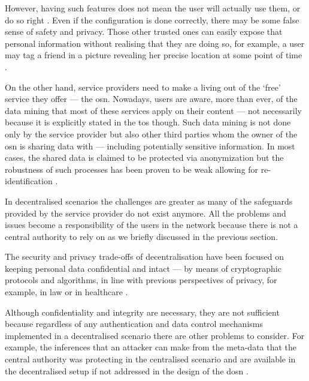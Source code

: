 \documentclass[showtrims, oldfontcommands]{kthesis}
\begin{document}
However, having such features does not mean the user will actually use them, or   
do so right \cite{KrishnamurthyW08, BrandtzaegLS10}. Even if the configuration is 
done correctly, there may be some false sense of safety and privacy. Those other 
trusted ones can easily expose that personal information without realising that 
they are doing so, for example, a user may tag a friend in a picture revealing her 
precise location at some point of time \cite{ZhelevaG09, SmithSHV12}. 

On the other hand, service providers need to make a living out of the `free' service
they offer --- the \ac{osn}. Nowadays, users are aware, more than ever, of the data 
mining that most of these services apply on their content --- not necessarily because 
it is explicitly stated in the \ac{tos} though. Such data mining is not done only 
by the service provider but also other third parties whom the owner of the \ac{osn} 
is sharing data with --- including potentially sensitive information. In most cases, 
the shared data is claimed to be protected via anonymization but the robustness 
of such processes has been proven to be weak allowing for re-identification \cite{NarayananS09}.

In decentralised scenarios the challenges are greater as many of the safeguards 
provided by the service provider do not exist anymore. All the problems and issues 
become a responsibility of the users in the network because there is not a central 
authority to rely on as we briefly discussed in the previous section.

The security and privacy trade-offs of decentralisation have been focused on keeping 
personal data confidential and intact --- by means of cryptographic protocols and 
algorithms, in line with previous perspectives of privacy, for example, in law \cite{Harvey92} 
or in healthcare \cite{BarrowsC96}. 

Although confidentiality and integrity are necessary, they are not sufficient because 
regardless of any authentication and data control mechanisms implemented in a decentralised 
scenario there are other problems to consider. For example, the inferences that 
an attacker can make from the meta-data that the central authority was protecting 
in the centralised scenario and are available in the decentralised setup if not addressed 
in the design of the \ac{dosn} \cite{GreschbachKB12}.

\end{document}
